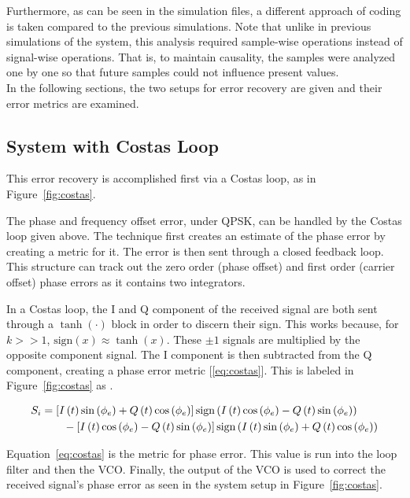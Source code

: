 \documentclass[]{article}
\newcommand{\rom}[1]{\uppercase\expandafter{\romannumeral#1}}
\begin{document}
Furthermore, as  can be seen in the simulation files, a different approach of coding is taken compared to the previous simulations. Note that unlike in previous simulations of the system, this analysis required sample-wise operations instead of signal-wise operations. That is, to maintain causality, the samples were analyzed one by one so that future samples could not influence present values.\\

In the following sections, the two setups for error recovery are given and their error metrics are examined.


\newpage

\subsection{System with Costas Loop}
This error recovery is accomplished first via a Costas loop, as in Figure~\ref{fig:costas}. 


The phase and frequency offset error, under QPSK, can be handled by the Costas loop given above. The technique first creates an estimate of the phase error by creating a metric for it.  The error is then sent through a closed feedback loop.  This structure can track out the zero order (phase offset) and first order (carrier offset) phase errors as it contains two integrators. 

In a Costas loop, the I and Q component of the received signal are both sent through a $\tanh\left(\cdot\right)$ block in order to discern their sign.  This works because, for $k>>1$, $\text{sign}\left(x\right) \approx \tanh \left(x\right)$.  These $\pm1$ signals are multiplied by the opposite component signal.  The I component is then subtracted from the Q component, creating a phase error metric [\ref{eq:costas}].  This is labeled in Figure~\ref{fig:costas} as \rom{1}. 

\begin{align}
  \label{eq:costas}
  S_{\rom{1}} &= \left[I\left(t\right)\sin\left(\phi_e\right)+Q\left(t\right)\cos\left(\phi_e\right)\right]\text{sign}\left(I\left(t\right)\cos\left(\phi_e\right)- Q\left(t\right)\sin\left(\phi_e\right)\right)\nonumber \\
  &\qquad {} - \left[I\left(t\right)\cos\left(\phi_e\right)-Q\left(t\right)\sin\left(\phi_e\right)\right]\text{sign}\left(I\left(t\right)\sin\left(\phi_e\right)+Q\left(t\right)\cos\left(\phi_e\right)\right)
  \end{align}


Equation~\ref{eq:costas} is the metric for phase error.  This value is run into the loop filter and then the VCO.  Finally, the output of the VCO is used to correct the received signal's phase error as seen in the system setup in Figure~\ref{fig:costas}.
\end{document}
